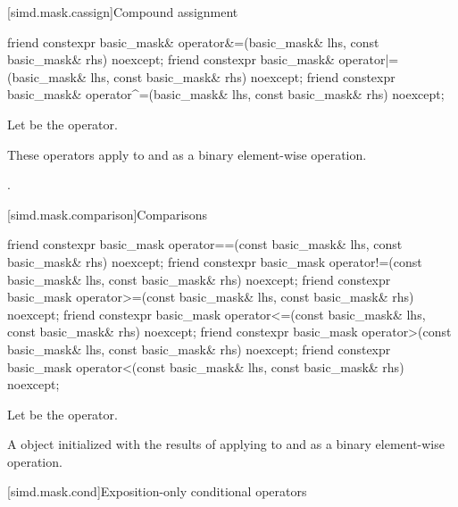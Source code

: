 [simd.mask.cassign]{Compound assignment}

\begin{itemdecl}
friend constexpr basic_mask&
  operator&=(basic_mask& lhs, const basic_mask& rhs) noexcept;
friend constexpr basic_mask&
  operator|=(basic_mask& lhs, const basic_mask& rhs) noexcept;
friend constexpr basic_mask&
  operator^=(basic_mask& lhs, const basic_mask& rhs) noexcept;
\end{itemdecl}

\begin{itemdescr}
\pnum
Let  be the operator.

\pnum
\effects
These operators apply  to  and  as a
binary element-wise operation.

\pnum
\returns
{}.
\end{itemdescr}

[simd.mask.comparison]{Comparisons}

\begin{itemdecl}
friend constexpr basic_mask
  operator==(const basic_mask& lhs, const basic_mask& rhs) noexcept;
friend constexpr basic_mask
  operator!=(const basic_mask& lhs, const basic_mask& rhs) noexcept;
friend constexpr basic_mask
  operator>=(const basic_mask& lhs, const basic_mask& rhs) noexcept;
friend constexpr basic_mask
  operator<=(const basic_mask& lhs, const basic_mask& rhs) noexcept;
friend constexpr basic_mask
  operator>(const basic_mask& lhs, const basic_mask& rhs) noexcept;
friend constexpr basic_mask
  operator<(const basic_mask& lhs, const basic_mask& rhs) noexcept;
\end{itemdecl}

\begin{itemdescr}
\pnum
Let  be the operator.

\pnum
\returns
A  object initialized with the results of applying
 to  and  as a binary element-wise
operation.
\end{itemdescr}

[simd.mask.cond]{Exposition-only conditional operators}

